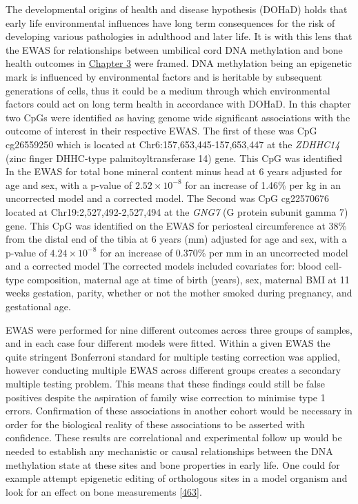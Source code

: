 \documentclass[
]{book}
\begin{document}
The developmental origins of health and disease hypothesis (DOHaD) holds that early life environmental influences have long term consequences for the risk of developing various pathologies in adulthood and later life.
It is with this lens that the EWAS for relationships between umbilical cord DNA methylation and bone health outcomes in \protect\hyperlink{arrays}{Chapter 3} were framed.
DNA methylation being an epigenetic mark is influenced by environmental factors and is heritable by subsequent generations of cells, thus it could be a medium through which environmental factors could act on long term health in accordance with DOHaD.
In this chapter two CpGs were identified as having genome wide significant associations with the outcome of interest in their respective EWAS.
The first of these was CpG cg26559250 which is located at Chr6:157,653,445-157,653,447 at the \emph{ZDHHC14} (zinc finger DHHC-type palmitoyltransferase 14) gene.
This CpG was identified In the EWAS for total bone mineral content minus head at 6 years adjusted for age and sex, with a p-value of \(2.52\times 10^{-8}\) for an increase of 1.46\% per kg in an uncorrected model and a corrected model.
The Second was CpG cg22570676 located at Chr19:2,527,492-2,527,494 at the \emph{GNG7} (G protein subunit gamma 7) gene.
This CpG was identified on the EWAS for periosteal circumference at 38\% from the distal end of the tibia at 6 years (mm) adjusted for age and sex, with a p-value of \(4.24\times 10^{-8}\) for an increase of 0.370\% per mm in an uncorrected model and a corrected model
The corrected models included covariates for: blood cell-type composition, maternal age at time of birth (years), sex, maternal BMI at 11 weeks gestation, parity, whether or not the mother smoked during pregnancy, and gestational age.

EWAS were performed for nine different outcomes across three groups of samples, and in each case four different models were fitted.
Within a given EWAS the quite stringent Bonferroni standard for multiple testing correction was applied, however conducting multiple EWAS across different groups creates a secondary multiple testing problem.
This means that these findings could still be false positives despite the aspiration of family wise correction to minimise type 1 errors.
Confirmation of these associations in another cohort would be necessary in order for the biological reality of these associations to be asserted with confidence.
These results are correlational and experimental follow up would be needed to establish any mechanistic or causal relationships between the DNA methylation state at these sites and bone properties in early life.
One could for example attempt epigenetic editing of orthologous sites in a model organism and look for an effect on bone measurements {[}\protect\hyperlink{ref-Gjaltema2020}{463}{]}.
\end{document}
